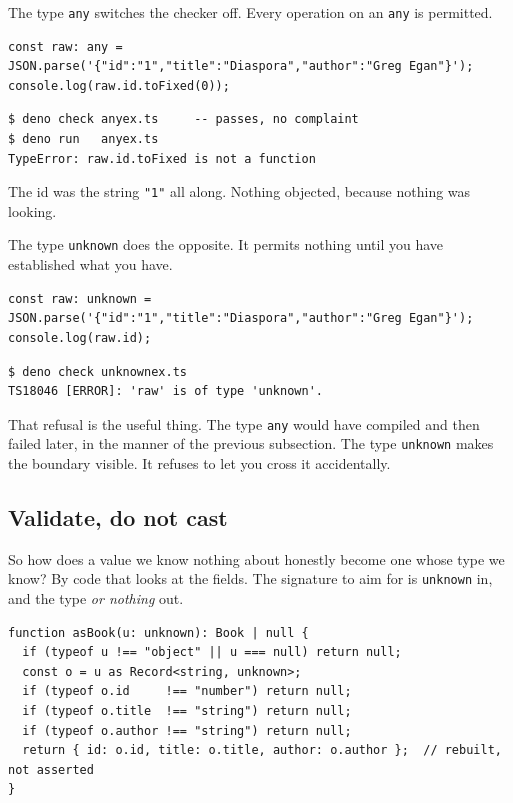\documentclass[11pt,a4paper]{article}
\begin{document}
The type \texttt{any} switches the checker off. Every operation on an \texttt{any} is permitted.

\begin{lstlisting}[language=TS]
const raw: any = JSON.parse('{"id":"1","title":"Diaspora","author":"Greg Egan"}');
console.log(raw.id.toFixed(0));
\end{lstlisting}

\begin{lstlisting}[language=SH]
$ deno check anyex.ts     -- passes, no complaint
$ deno run   anyex.ts
TypeError: raw.id.toFixed is not a function
\end{lstlisting}

The id was the string \texttt{"1"} all along. Nothing objected, because nothing was looking.

The type \texttt{unknown} does the opposite. It permits nothing until you have established what you
have.

\begin{lstlisting}[language=TS]
const raw: unknown = JSON.parse('{"id":"1","title":"Diaspora","author":"Greg Egan"}');
console.log(raw.id);
\end{lstlisting}

\begin{lstlisting}[language=SH]
$ deno check unknownex.ts
TS18046 [ERROR]: 'raw' is of type 'unknown'.
\end{lstlisting}

That refusal is the useful thing. The type \texttt{any} would have compiled and then failed later, in the
manner of the previous subsection. The type \texttt{unknown} makes the boundary visible. It refuses to let
you cross it accidentally.

\subsection{Validate, do not cast}

So how does a value we know nothing about honestly become one whose type we know? By code that looks at
the fields. The signature to aim for is \texttt{unknown} in, and the type \emph{or nothing} out.

\begin{lstlisting}[language=TS]
function asBook(u: unknown): Book | null {
  if (typeof u !== "object" || u === null) return null;
  const o = u as Record<string, unknown>;
  if (typeof o.id     !== "number") return null;
  if (typeof o.title  !== "string") return null;
  if (typeof o.author !== "string") return null;
  return { id: o.id, title: o.title, author: o.author };  // rebuilt, not asserted
}
\end{lstlisting}
\end{document}
